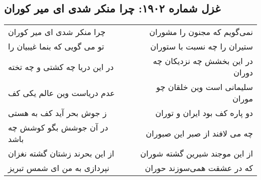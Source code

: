 \begin{center}
\section*{غزل شماره ۱۹۰۲: چرا منکر شدی ای میر کوران}
\label{sec:1902}
\begin{longtable}{l p{0.5cm} r}
چرا منکر شدی ای میر کوران
&&
نمی‌گویم که مجنون را مشوران
\\
تو می گویی که بنما غیبیان را
&&
ستیران را چه نسبت با ستوران
\\
در این دریا چه کشتی و چه تخته
&&
در این بخشش چه نزدیکان چه دوران
\\
عدم دریاست وین عالم یکی کف
&&
سلیمانی است وین خلقان چو موران
\\
ز جوش بحر آید کف به هستی
&&
دو پاره کف بود ایران و توران
\\
در آن جوشش بگو کوشش چه باشد
&&
چه می لافند از صبر این صبوران
\\
از این بحرند زشتان گشته نغزان
&&
از این موجند شیرین گشته شوران
\\
نپردازی به من ای شمس تبریز
&&
که در عشقت همی‌سوزند حوران
\\
\end{longtable}
\end{center}

